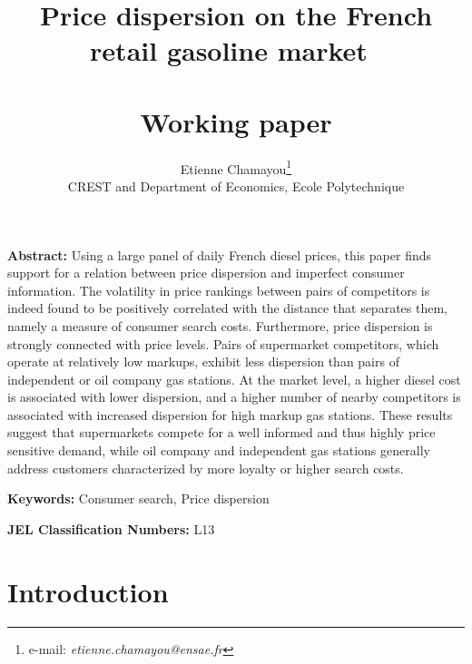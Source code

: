 \documentclass[english]{article}
\begin{document}
\title{Price dispersion on the French retail gasoline market\ \\ \ \\Working paper}
\author{Etienne Chamayou\thanks{e-mail:
\textit{etienne.chamayou@ensae.fr}}\medskip\\{\normalsize CREST and Department of Economics, Ecole Polytechnique }}
\maketitle

\sloppy%

\onehalfspacing

\textbf{Abstract:}
Using a large panel of daily French diesel prices, this paper finds support for a relation between price dispersion and imperfect consumer information. The volatility in price rankings between pairs of competitors is indeed found to be positively correlated with the distance that separates them, namely a measure of consumer search costs. Furthermore, price dispersion is strongly connected with price levels. Pairs of supermarket competitors, which operate at relatively low markups, exhibit less dispersion than pairs of independent or oil company gas stations. At the market level, a higher diesel cost is associated with lower dispersion, and a higher number of nearby competitors is associated with increased dispersion for high markup gas stations. These results suggest that supermarkets compete for a well informed and thus highly price sensitive demand, while oil company and independent gas stations generally address customers characterized by more loyalty or higher search costs.

\strut

\textbf{Keywords:} Consumer search, Price dispersion

\strut

\textbf{JEL Classification Numbers:} L13

\pagebreak%

\section{Introduction}
\end{document}
